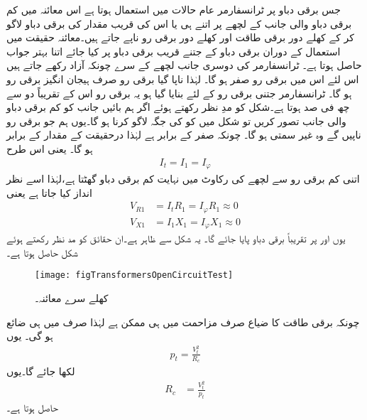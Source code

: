  جس برقی دباو پر ٹرانسفارمر عام حالات میں استعمال ہوتا ہے اس معائنہ میں کم برقی دباو والی جانب کے لچھے پر اتنے ہی یا اس کی قریب مقدار کی برقی دباو  لاگو کر کے کھلے دور برقی طاقت  اور  کھلے دور برقی رو   ناپے جاتے ہیں۔معائنہ حقیقت میں استعمال کے دوران برقی دباو کے جتنے قریب برقی دباو پر کیا جائے اتنا بہتر جواب حاصل ہوتا ہے۔ ٹرانسفارمر کی دوسری جانب لچھے کے سرے چونکہ آزاد رکھے جاتے ہیں اس لئے اس میں  برقی رو صفر ہو گا۔  لہٰذا ناپا گیا برقی رو صرف ہیجان انگیز برقی رو  ہو گا۔ ٹرانسفارمر جتنی برقی رو کے لئے بنایا گیا ہو یہ برقی رو اس  کے تقریباً دو سے چھ  فی صد ہوتا ہے۔شکل    کو مدِ نظر رکھتے ہوئے اگر ہم بائیں جانب کو کم برقی دباو والی جانب تصور کریں تو شکل میں  کو   کی جگہ لاگو کرنا ہو گا۔یوں ہم جو برقی رو ناپیں گے وہ  غیر سمتی   ہو گا۔ چونکہ   صفر کے برابر ہے لہٰذا   درحقیقت  کے مقدار  کے برابر ہو گا۔ یعنی  اس  طرح
\begin{align*}
I_t=I_1=I_\varphi
\end{align*}
اتنی کم برقی رو سے لچھے کی رکاوٹ میں نہایت کم برقی دباو گھٹتا ہے،لہٰذا اسے نظر انداز کیا جاتا ہے یعنی
\begin{align*}
V_{R1}&=I_t R_1=I_\varphi R_1 \approx 0\\
V_{X1}&=I_1 X_1=I_\varphi X_1 \approx 0
\end{align*}
یوں    اور  پر  تقریباً  برقی دباو پایا جائے گا۔ یہ شکل   سے ظاہر ہے۔ان حقائق کو مد نظر رکھتے ہوئے شکل  حاصل ہوتا ہے۔
\begin{figure}
\centering
\texttt{[image: figTransformersOpenCircuitTest]}
\caption{کھلے سرے معائنہ۔}
\label{شکل_ٹرانسفارمر_کھلے_سرے_معائنہ}
\end{figure}

چونکہ برقی طاقت کا ضیاع صرف مزاحمت میں ہی ممکن ہے لہٰذا  صرف    میں ہی ضائع ہو گی۔ یوں
\begin{align*}
p_t=\frac{V_t^2}{R_c}
\end{align*}
لکھا جائے گا۔یوں
\begin{align}\label{مساوات_ٹرانسفارمر_کھلے_دور_مزاحمت_حاصل}
R_c&=\frac{V_t^2}{p_t}
\end{align}
حاصل ہوتا ہے۔

